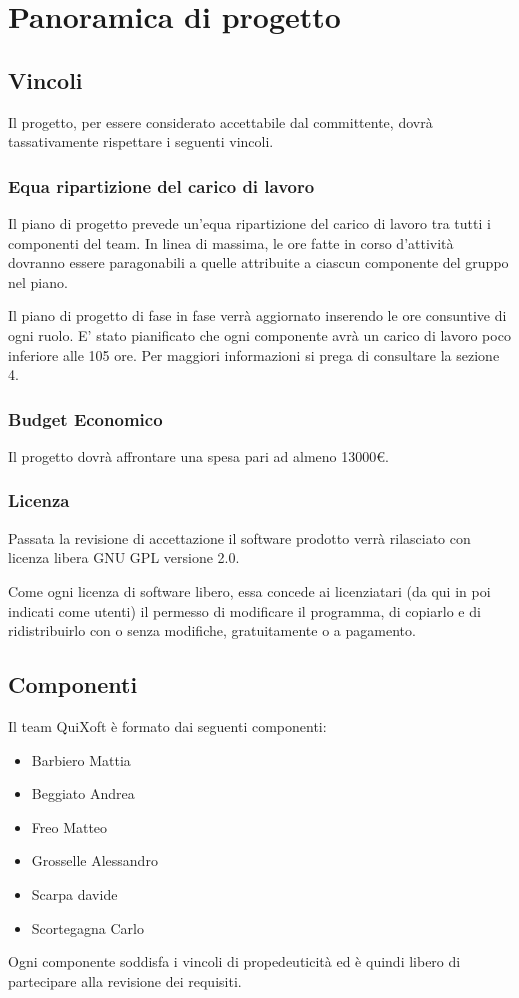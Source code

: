 \documentclass[11pt,a4paper]{article}
\begin{document}
\section{Panoramica di progetto}
\subsection{Vincoli}
Il progetto, per essere considerato accettabile dal committente, dovrà tassativamente rispettare i seguenti vincoli.
\subsubsection{Equa ripartizione del carico di lavoro}
Il piano di progetto prevede un'equa ripartizione del carico di lavoro tra tutti i componenti del team.
In linea di massima, le ore fatte in corso d'attività dovranno essere paragonabili a quelle attribuite a ciascun componente del gruppo nel piano.

Il piano di progetto di fase in fase verrà aggiornato inserendo le ore consuntive di ogni ruolo.
E' stato pianificato che ogni componente avrà un carico di lavoro poco inferiore alle 105 ore. Per maggiori informazioni si prega di consultare la sezione 4.
\subsubsection{Budget Economico}
Il progetto dovrà affrontare una spesa pari ad almeno 13000\euro.
\subsubsection{Licenza}
Passata la revisione di accettazione il software prodotto verrà rilasciato con licenza libera GNU GPL versione 2.0.

Come ogni licenza di software libero, essa concede ai licenziatari (da qui in poi indicati come utenti) il permesso di modificare il programma, di copiarlo e di ridistribuirlo con o senza modifiche, gratuitamente o a pagamento.
\subsection{Componenti}
Il team QuiXoft è formato dai seguenti componenti:
\begin{itemize}
\item Barbiero Mattia
\item Beggiato Andrea
\item Freo Matteo
\item Grosselle Alessandro
\item Scarpa davide
\item Scortegagna Carlo 
\end{itemize}
Ogni componente soddisfa i vincoli di propedeuticità ed è quindi libero di partecipare alla revisione dei requisiti.
\end{document}
